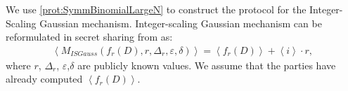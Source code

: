       We use \autoref{prot:SymmBinomialLargeN} to construct the \smpc protocol for the Integer-Scaling Gaussian mechanism.
      Integer-scaling Gaussian mechanism can be reformulated in secret sharing from as:
      \begin{equation}
            \begin{split}
                  \left\langle M_{ISGauss}\left( f_r\left(D\right) ,r,\Delta_r,\varepsilon,\delta\right)\right\rangle =\left\langle f_r\left(D\right)\right\rangle + \left\langle i\right\rangle  \cdot r,
            \end{split}
      \end{equation}
      where $r$, $\Delta _r$, $\varepsilon$,$\delta$ are publicly known values. We assume that the parties have already computed $\left\langle {f_r\left(D\right)}\right\rangle$.




